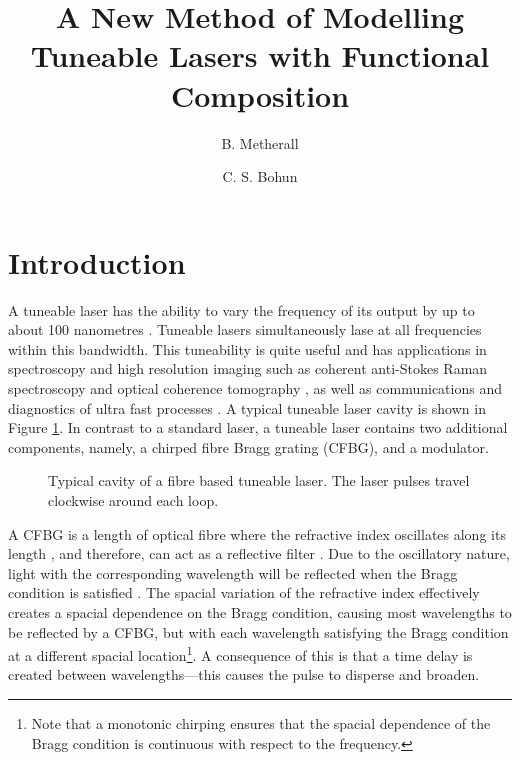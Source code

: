 \documentclass[10pt,twocolumn,a4paper]{article}
\title{A New Method of Modelling Tuneable Lasers with Functional Composition}
\author{B. Metherall \and C. S. Bohun}
\begin{document}

\section{Introduction}
\label{sec:intro}
A tuneable laser has the ability to vary the frequency of its output by up to about 100 nanometres \cite{bohun, burgoyne2010, yamashita}. Tuneable lasers simultaneously lase at all frequencies within this bandwidth. This tuneability is quite useful and has applications in spectroscopy and high resolution imaging such as coherent anti-Stokes Raman spectroscopy and optical coherence tomography \cite{bohun, burgoyne2014, yamashita}, as well as communications and diagnostics of ultra fast processes \cite{silfvast}. A typical tuneable laser cavity is shown in Figure \ref{fig:cavity}. In contrast to a standard laser, a tuneable laser contains two additional components, namely, a chirped fibre Bragg grating (CFBG), and a modulator.

\begin{figure}[tbp]
\centering

\caption{Typical cavity of a fibre based tuneable laser. The laser pulses travel clockwise around each loop.}
\label{fig:cavity}
\end{figure}
A CFBG is a length of optical fibre where the refractive index oscillates along its length \cite{ferreira}, and therefore, can act as a reflective filter \cite{agrawal2002, alazzawi, ferreira, starodoumov}. Due to the oscillatory nature, light with the corresponding wavelength will be reflected when the Bragg condition is satisfied \cite{agrawal2002, alazzawi, becker, ferreira, silfvast, starodoumov}. The spacial variation of the refractive index effectively creates a spacial dependence on the Bragg condition, causing most wavelengths to be reflected by a CFBG, but with each wavelength satisfying the Bragg condition at a different spacial location\footnote{Note that a monotonic chirping ensures that the spacial dependence of the Bragg condition is continuous with respect to the frequency.}. A consequence of this is that a time delay is created between wavelengths---this causes the pulse to disperse and broaden.
\end{document}
